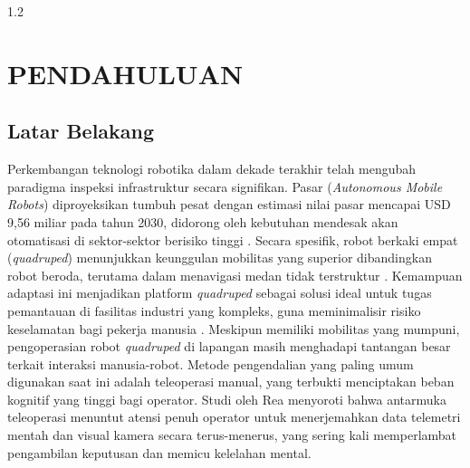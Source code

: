 
\begin{spacing}{1.2}
  \chapter{PENDAHULUAN}
\end{spacing}


\vspace{4ex}

\section{Latar Belakang}
Perkembangan teknologi robotika dalam dekade terakhir telah mengubah paradigma inspeksi infrastruktur secara signifikan. Pasar (\textit{Autonomous Mobile Robots}) diproyeksikan tumbuh pesat dengan estimasi nilai pasar mencapai USD 9,56 miliar pada tahun 2030, didorong oleh kebutuhan mendesak akan otomatisasi di sektor-sektor berisiko tinggi \cite{GrandView2024}. Secara spesifik, robot berkaki empat (\textit{quadruped}) menunjukkan keunggulan mobilitas yang superior dibandingkan robot beroda, terutama dalam menavigasi medan tidak terstruktur \cite{fan2024review}. Kemampuan adaptasi ini menjadikan platform \textit{quadruped} sebagai solusi ideal untuk tugas pemantauan di fasilitas industri yang kompleks, guna meminimalisir risiko keselamatan bagi pekerja manusia \cite{LookingGlass2024}. Meskipun memiliki mobilitas yang mumpuni, pengoperasian robot \textit{quadruped} di lapangan masih menghadapi tantangan besar terkait interaksi manusia-robot. Metode pengendalian yang paling umum digunakan saat ini adalah teleoperasi manual, yang terbukti menciptakan beban kognitif yang tinggi bagi operator. Studi oleh Rea \cite{rea2022still} menyoroti bahwa antarmuka teleoperasi menuntut atensi penuh operator untuk menerjemahkan data telemetri mentah dan visual kamera secara terus-menerus, yang sering kali memperlambat pengambilan keputusan dan memicu kelelahan mental. 

